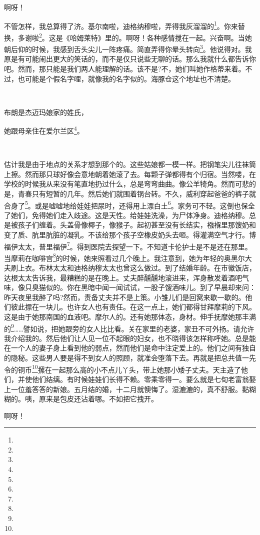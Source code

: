 \par 啊呀！
\par 不管怎样，我总算得了济。基尔南啦，迪格纳穆啦，弄得我灰溜溜的\footnote{}。你来替换，多谢啦\footnote{}。这是《哈姆莱特》里的。啊呀！各种感情搅在一起。兴奋啊。当她朝后仰的时候，我感到舌头尖儿一阵疼痛。简直弄得你晕头转向\footnote{}。他说得对。我原是有可能闹出更大的笑话的，而不是仅只说些无聊的话。那么我就什么都告诉你吧。然而，那只能是我们两人能理解的话。该不是?不，她们叫她作格蒂来着。不过，也可能是个假名字哩，就像我的名字似的。海豚仓这个地址也不清楚。
\par  
\par 布朗是杰迈玛娘家的姓氏，
\par 她跟母亲住在爱尔兰区\footnote{}。
\par  
\par 估计我是由于地点的关系才想到那个的。这些姑娘都一模一样。把钢笔尖儿往袜筒上擦。然而那只球好像会意地朝着她滚了去。每颗子弹都得有个归宿。当然喽，在学校的时候我从来没有笔直地扔过什么，总是弯弯曲曲。像公羊犄角。然而可悲的是，青春只有短暂的几年。然后她们就围着锅台转。不久，威利穿起爸爸的裤子就合身了\footnote{}。或是嘘嘘地给娃娃把尿时，还得用上漂白土\footnote{}。家务可不轻。这倒也保全了她们，免得她们走入歧途。这是天性。给娃娃洗澡，为尸体净身。迪格纳穆。总是被孩子们缠着。头盖骨像椰子，像猴子。起初甚至没有长结实，襁褓里那馊奶和变了质、肮里肮脏的凝乳。不该给那个孩子空橡皮奶头去咂。得灌满空气才行。博福伊太太，普里福伊\footnote{}。得到医院去探望一下。不知道卡伦护士是不是还在那里。当摩莉在咖啡宫\footnote{}的时候，她来照看过几个晚上。我注意到，她为年轻的奥黑尔大夫刷上衣。布林太太和迪格纳穆太太也曾这么做过。到了结婚年龄。在市徽饭店，达根太太告诉我，最糟糕的是在晚上。丈夫醉醺醺地滚进来，浑身散发着酒吧气味，像只臭猫似的。你在黑暗中闻一闻试试，一股子馊酒味儿。到了早晨却来问：昨天夜里我醉了吗?然而，责备丈夫并不是上策。小雏儿们是回窝来歇一歇的。他们彼此摽在一块儿。也许女人也有责任。在这一点上，她们都得甘拜摩莉的下风。这是由于她那南国的血液吧。摩尔人的。还有她那体态，身材。伸手抚摩她那丰满的\footnote{}……譬如说，把她跟旁的女人比比看。关在家里的老婆，家丑不可外扬。请允许我介绍我的。然后他们让人见一位不起眼的妇女，也不晓得该怎样称呼她。总是能在一个人的妻子身上看到他的弱点，然而他们是命中注定爱上的。他们之间有独自的隐秘。这些男人要是得不到女人的照顾，就准会堕落下去。再就是把总共值一先令的铜币\footnote{}摞在一起那么高的小不点儿丫头，带上她那小矮子丈夫。天主造了他们，并使他们结缡。有时候娃娃们长得不赖。零乘零得一。要么就是七旬老富翁娶上一位羞答答的新娘。五月结的婚，十二月就懊悔了。湿漉漉的，真不舒服。黏糊糊的。咦，原来是包皮还沾着哪。不如把它拽开。
\par 啊呀！
